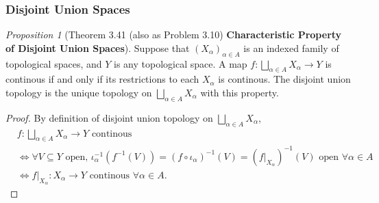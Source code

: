 \documentclass[a4paper]{article}
\theoremstyle{remark}
\newtheorem{prop}{Proposition}
\newcommand{\subhim}{\subseteq} %
\begin{document}
\subsubsection*{Disjoint Union Spaces}
 \begin{prop}[Theorem 3.41 (also as Problem 3.10) \textbf{Characteristic Property of Disjoint Union Spaces}]
 	Suppose that $(X_{\alpha})_{\alpha \in A}$ is an indexed family of topological spaces, and $Y$ is any topological space. A map $f : \bigsqcup_{\alpha \in A} X_{\alpha} \to Y$ is continous if and only if its restrictions to each $X_{\alpha}$ is continous. The disjoint union topology is the unique topology on $\bigsqcup_{\alpha \in A} X_{\alpha}$ with this property. 
 \end{prop}
\begin{proof}
	By definition of disjoint union topology on $\bigsqcup_{\alpha \in A} X_{\alpha}$, 
	\begin{align*}
	&f: \bigsqcup_{\alpha \in A} X_{\alpha} \to Y \text{ continous } \\&\Leftrightarrow  \forall V \subhim Y \text{ open, }  \iota_{\alpha}^{-1}(f^{-1}(V)) =(f \circ \iota_{\alpha})^{-1}(V)=(f|_{X_{\alpha}})^{-1}(V) \text{ open } \forall \alpha \in A \\ &\Leftrightarrow f|_{X_{\alpha}} :X_{\alpha} \to Y  \text{ continous } \forall \alpha \in A.
	\end{align*} 
	

\end{proof}
\end{document}

